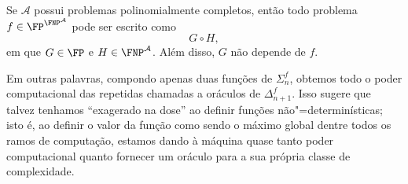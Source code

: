 \begin{ucorollary}
    Se $\mathcal A$ possui problemas polinomialmente completos,
    então todo problema $f \in \FP^{\FNP^\mathcal A}$
    pode ser escrito como
    \begin{equation*}
        G \circ H,
    \end{equation*}
    em que $G \in \FP$ e $H \in \FNP^\mathcal A$.
    Além disso, $G$ não depende de $f$.
    \label{thm:strong_compositive_closure}
\end{ucorollary}

Em outras palavras,
compondo apenas duas funções de $\Sigma_n^f$,
obtemos todo o poder computacional
das repetidas chamadas a oráculos de $\Delta_{n+1}^f$.
Isso sugere que talvez tenhamos ``exagerado na dose''
ao definir funções não"=determinísticas;
isto é,
ao definir o valor da função
como sendo o máximo global dentre todos os ramos de computação,
estamos dando à máquina quase tanto poder computacional
quanto fornecer um oráculo para a sua própria classe de complexidade.
